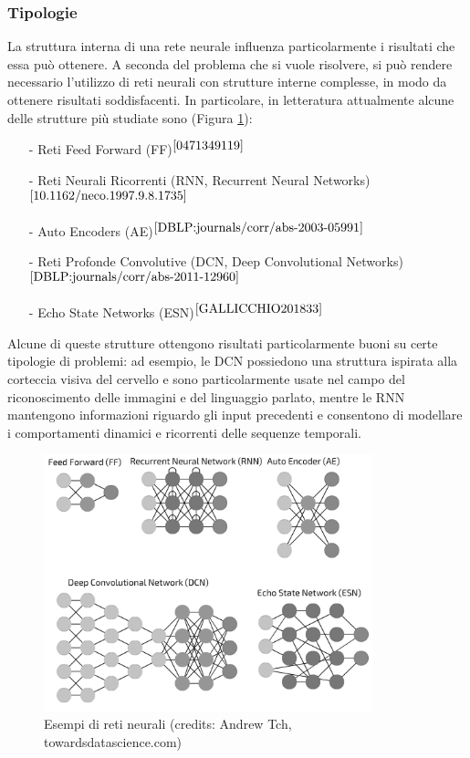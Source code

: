 \subsubsection{Tipologie} La struttura interna di una rete neurale influenza particolarmente i risultati che essa può ottenere. A seconda del problema che si vuole risolvere, si può rendere necessario l'utilizzo di reti neurali con strutture interne complesse, in modo da ottenere risultati soddisfacenti. In particolare, in letteratura attualmente alcune delle strutture più studiate sono (Figura \ref{fig:tipologiereti}):
\begin{itemize}
    \item[-] Reti Feed Forward (FF)$^{\cite{0471349119}}$
    \item[-] Reti Neurali Ricorrenti (RNN, Recurrent Neural Networks)$^{\cite{10.1162/neco.1997.9.8.1735}}$
    \item[-] Auto Encoders (AE)$^{\cite{DBLP:journals/corr/abs-2003-05991}}$
    \item[-] Reti Profonde Convolutive (DCN, Deep Convolutional Networks)$^{\cite{DBLP:journals/corr/abs-2011-12960}}$
    \item[-] Echo State Networks (ESN)$^{\cite{GALLICCHIO201833}}$
\end{itemize}
Alcune di queste strutture ottengono risultati particolarmente buoni su certe tipologie di problemi: ad esempio, le DCN possiedono una struttura ispirata alla corteccia visiva del cervello e sono particolarmente usate nel campo del riconoscimento delle immagini e del linguaggio parlato, mentre le RNN mantengono informazioni riguardo gli input precedenti e consentono di modellare i comportamenti dinamici e ricorrenti delle sequenze temporali.
\begin{figure}[h]
	\begin{center}
		\includegraphics[width=0.85\textwidth]{img/tipologiereti.png}
		\caption{Esempi di reti neurali (credits: Andrew Tch, towardsdatascience.com)}
		\label{fig:tipologiereti}
	\end{center}
\end{figure}


